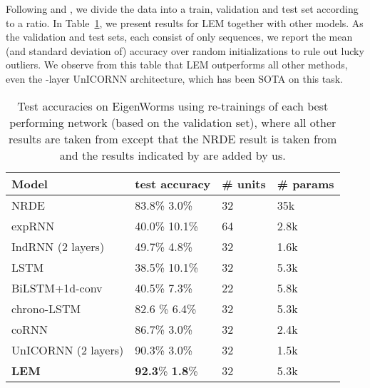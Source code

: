 \documentclass{article} \usepackage{iclr2022_conference,times}
\newcommand{\Tref}[1]{Table~\ref{#1}}
\begin{document}
Following \citet{log_ode} and \cite{unicornn}, we divide the data into a train, validation and test set according to a  ratio. In \Tref{tab:worms}, we present results for LEM together with other models. As the validation and test sets, each consist of only  sequences, we report the mean (and standard deviation of) accuracy over  random initializations to rule out lucky outliers. We observe from this table that LEM outperforms all other methods, even the -layer UnICORNN architecture, which has been SOTA on this task. 
\begin{table}[t!]
\caption{Test accuracies on EigenWorms using  re-trainings of each best performing network (based on the validation set), where all other results are taken from \citet{unicornn} except that the NRDE result is taken from \cite{log_ode} and the results indicated by  are added by us.}
\label{tab:worms}
\centering
\begin{tabular}{llll}
\toprule
\cmidrule(r){1-4}
Model &  test accuracy & \# units & \# params \\
\midrule
NRDE & 83.8\%  3.0\% & 32 & 35k \\
expRNN & 40.0\%  10.1\% & 64 & 2.8k \\
IndRNN (2 layers) & 49.7\%  4.8\% & 32 & 1.6k \\
LSTM & 38.5\%  10.1\% & 32 & 5.3k \\
BiLSTM+1d-conv & 40.5\%  7.3\% & 22 & 5.8k \\
chrono-LSTM & 82.6 \%  6.4\% & 32 & 5.3k \\
coRNN & 86.7\%  3.0\%&32 & 2.4k \\
UnICORNN (2 layers) & 90.3\%  3.0\% & 32 & 1.5k\\
\textbf{LEM} & \textbf{92.3}\%  \textbf{1.8}\% & 32 & 5.3k \\
    \bottomrule
  \end{tabular}
\end{table}
\end{document}
